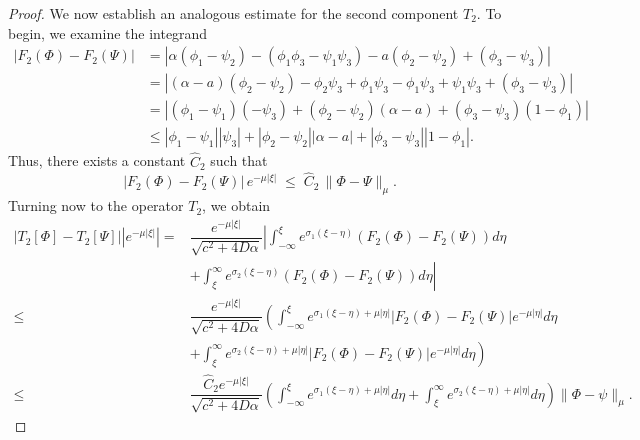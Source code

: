\documentclass[11pt]{article}
\theoremstyle{definition}
\begin{document}
{\begin{proof}
We now establish an analogous estimate for the second component $T_2$. To begin, we examine the integrand
\begin{align}
   \nonumber |F_2(\Phi)- F_2(\Psi)|&=|\alpha(\phi_1-\psi_2)-(\phi_1\phi_3-\psi_1\psi_3)-a(\phi_2-\psi_2)+(\phi_3-\psi_3)|\\ \nonumber & =|(\alpha-a)(\phi_2-\psi_2)-\phi_2\psi_3+\phi_1\psi_3-\phi_1\psi_3+\psi_1\psi_3+(\phi_3-\psi_3)|\\&=|(\phi_1-\psi_1)(-\psi_3)+(\phi_2-\psi_2)(\alpha-a)+(\phi_3-\psi_3)(1-\phi_1)|\\ &\le |\phi_1-\psi_1||\psi_3|+|\phi_2-\psi_2||\alpha-a|+|\phi_3-\psi_3||1-\phi_1|.
\end{align}
        Thus, there exists a constant $\widehat C_2$ such that
\[
\bigl|F_2(\Phi)-F_2(\Psi)\bigr|\, e^{-\mu|\xi|}
   \;\le\; \widehat C_2\,\|\Phi-\Psi\|_\mu .
\]
Turning now to the operator $T_2$, we obtain
\begin{align}
    |T_2[\Phi]-T_2[\Psi]||e^{- \mu |\xi|}|=& \dfrac{e^{-\mu |\xi|}}{\sqrt{c^2+ 4 D \alpha}}\left|\int_{- \infty}^{\xi}e^{\sigma_1(\xi-\eta)}\left(F_2(\Phi)- F_2(\Psi)\right) d \eta 
 \right. \\ & \left. + \int_{\xi}^{\infty }e^{\sigma_2(\xi-\eta)}\left(F_2(\Phi)- F_2(\Psi)\right) d \eta  \right| \\ \le &\dfrac{e^{-\mu |\xi|}}{\sqrt{c^2+ 4 D \alpha}}\left(\int_{- \infty}^{\xi}e^{\sigma_1(\xi-\eta)+ \mu|\eta|}\left|F_2(\Phi)- F_2(\Psi)\right|e^{-\mu |\eta|} d \eta 
 \right. \\ & \left.+ \int_{\xi}^{\infty }e^{\sigma_2(\xi-\eta)+ \mu|\eta|}\left|F_2(\Phi)- F_2(\Psi)\right|e^{-\mu |\eta|} d \eta  \right) \\ \leq &\dfrac{{\widehat C_2} e^{-\mu |\xi|}}{\sqrt{c^2+ 4 D \alpha}}\left(\int_{- \infty}^{\xi}e^{\sigma_1(\xi-\eta)+ \mu|\eta|} d \eta 
 + \int_{\xi}^{\infty }e^{\sigma_2(\xi-\eta)+ \mu|\eta|} d \eta  \right)\|\Phi-\psi\|_\mu.
\end{align}


\end{proof}}
\end{document}
